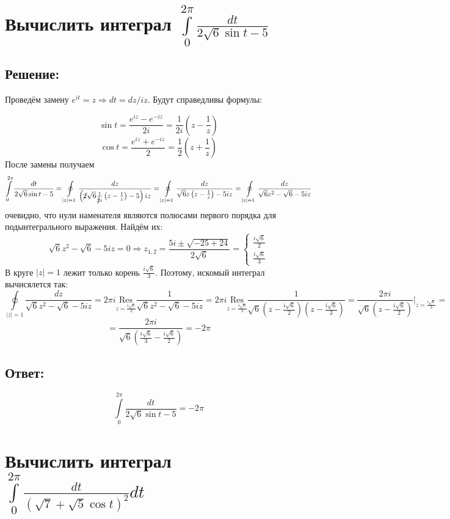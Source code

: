 \documentclass{article}
\begin{document}
	\section{Вычислить интеграл $\int\limits_{0}^{2\pi} \frac{dt}{2\sqrt{6}\sin t - 5}$}
	\subsection{Решение:}
	Проведём замену $e^{it} = z\Rightarrow dt = dz/iz$. Будут справедливы формулы:
	
	\[\sin t = \frac{e^{iz} - e^{-iz}}{2i} = \frac{1}{2i}\left(z - \frac{1}{z}\right)\]
	\[\cos t = \frac{e^{iz} + e^{-iz}}{2} = \frac{1}{2}\left(z + \frac{1}{z}\right)\]
	После замены получаем
	\[\int\limits_{0}^{2\pi} \frac{dt}{2\sqrt{6}\sin t - 5} = \oint \limits_{|z|=1} \frac{dz}{\left(\cancel{2} \sqrt{6} \frac{1}{\cancel{2}i}\left(z - \frac{1}{z}\right) -5\right)iz} = \oint \limits_{|z|=1} \frac{dz}{\sqrt{6}z \left(z - \frac{1}{z}\right) -5iz} = \oint \limits_{|z|=1} \frac{dz}{\sqrt{6}z^2 - \sqrt{6} -5iz}\]
	очевидно, что нули наменателя являются полюсами первого порядка для подынтегрального выражения. Найдём их:
	\[\sqrt{6}z^2 - \sqrt{6} -5iz =0 \Rightarrow z_{1,2} = \frac{5i \pm \sqrt{-25 + 24}}{2\sqrt{6}} = \begin{cases}
		\frac{i\sqrt{6}}{2} \\
		\frac{i\sqrt{6}}{3}
	\end{cases}\]
	В круге $|z|=1$ лежит только корень $\frac{i\sqrt{6}}{3}$. Поэтому, искомый интеграл вычисялется так:
	\[\oint \limits_{|z|=1} \frac{dz}{\sqrt{6}z^2 - \sqrt{6} -5iz} = 2\pi i \underset{z=\frac{i\sqrt{6}}{3}}{\text{Res}} \frac{1}{\sqrt{6}z^2 - \sqrt{6} -5iz} = 2\pi i \underset{z=\frac{i\sqrt{6}}{3}}{\text{Res}} \frac{1}{\sqrt{6}\left(z - \frac{i\sqrt{6}}{2}\right)\left(z - \frac{i\sqrt{6}}{3}\right)} = \frac{2\pi i}{\sqrt{6}\left(z - \frac{i\sqrt{6}}{2}\right)}\Big|_{z = \frac{i\sqrt{6}}{3}}  =\]
	\[= \frac{2 \pi i }{\sqrt{6}\left(\frac{i\sqrt{6}}{3} - \frac{i\sqrt{6}}{2}\right)} = -2\pi\]
	\subsection{Ответ:}
	\[\int\limits_{0}^{2\pi} \frac{dt}{2\sqrt{6}\sin t - 5} = -2\pi\]
	
	
	\section{Вычислить интеграл $\int\limits_{0}^{2\pi} \frac{dt}{\left(\sqrt{7} + \sqrt{5}\cos t\right)^2}dt$}
\end{document}
